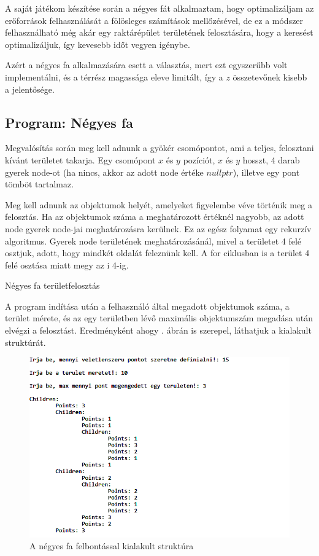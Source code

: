 A saját játékom készítése során a négyes fát alkalmaztam, hogy optimalizáljam az erőforrások felhasználását a fölösleges számítások mellőzésével, de ez a módszer felhasználható még akár egy raktárépület területének felosztására, hogy a keresést optimalizáljuk, így kevesebb időt vegyen igénybe.

Azért a négyes fa alkalmazására esett a választás, mert ezt egyszerűbb volt implementálni, és a térrész magassága eleve limitált, így a $z$ összetevőnek kisebb a jelentősége.

\subsection{Program: Négyes fa}

Megvalósítás során meg kell adnunk a gyökér csomópontot, ami a teljes, felosztani kívánt területet takarja. Egy csomópont $x$ és $y$ pozíciót, $x$ és $y$ hosszt, 4 darab gyerek node-ot (ha nincs, akkor az adott node értéke $nullptr$), illetve egy pont tömböt tartalmaz.

Meg kell adnunk az objektumok helyét, amelyeket figyelembe véve történik meg a felosztás. Ha az objektumok száma a meghatározott értéknél nagyobb, az adott node gyerek node-jai meghatározásra kerülnek. Ez az egész folyamat egy rekurzív algoritmus. Gyerek node területének meghatározásánál, mivel a területet 4 felé osztjuk, adott, hogy mindkét oldalát feleznünk kell. A for ciklusban is a terület 4 felé osztása miatt megy az i 4-ig. 

\begin{algorithm}[H]
 \caption{Négyes fa területfelosztás}
\end{algorithm}

A program indítása után a felhasználó által megadott objektumok száma, a terület mérete, és az egy területben lévő maximális objektumszám megadása után elvégzi a felosztást. Eredményként ahogy . ábrán is szerepel, láthatjuk a kialakult struktúrát.

\begin{figure}[h]
\centering
\includegraphics[scale=0.65]{kepek/quadtree_demo.png}
\caption{A négyes fa felbontással kialakult struktúra}
\label{fig:quad_demo}
\end{figure}
